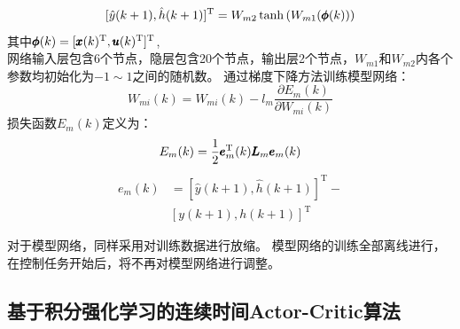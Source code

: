 \begin{equation}
\label{modelNN} [\hat{y}(k+1), \hat{h}(k+1)]^{\rm T}=W_{m 2} \tanh
\left(W_{m 1}( \pmb \phi(k))\right)
\end{equation}
其中$\pmb \phi (k)=[\pmb x(k)^{\rm T}, \pmb u(k)^{\rm T}]^{\rm T}$,\\
网络输入层包含6个节点，隐层包含20个节点，输出层2个节点，$ W _ { m1
}$和$ W _ { m 2 }$内各个参数均初始化为$-1\sim 1$之间的随机数。
通过梯度下降方法训练模型网络：
\begin{equation}
\label{equ:train_modelnn} W_{mi}(k)=W_{m i}(k)-l_{m } \frac{\partial
E_{m}(k)}{\partial W_{m i}(k)}
\end{equation}
损失函数$E_{m}(k)$定义为：
\begin{equation}
\label{equ:loss_modelnn} E_{m}(k)=\frac{1}{2} \pmb e_{m}^{\rm
T}(k)\pmb L_{m}\pmb e_{m}(k)
\end{equation}
\begin{equation}
\label{em_modelnn}
\begin{aligned} e_{m}(k)&=[\hat{y}(k+1), \hat{h}(k+1)]^{\mathrm{T}}-\\ &[y(k+1),h(k+1)]^{\mathrm{T}} \end{aligned}
\end{equation}


对于模型网络，同样采用对训练数据进行放缩。
模型网络的训练全部离线进行，在控制任务开始后，将不再对模型网络进行调整。
\subsection{基于积分强化学习的连续时间Actor-Critic算法}

